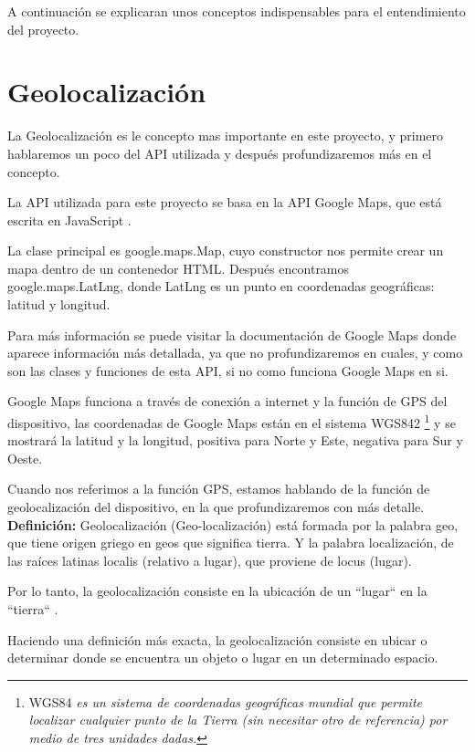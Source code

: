 
A continuación se explicaran unos conceptos indispensables para el entendimiento del proyecto.
\section{Geolocalización}\label{geolocalizacion}
La Geolocalización es le concepto mas importante en este proyecto, y primero hablaremos un poco del API utilizada y después profundizaremos más en el concepto.

La API utilizada para este proyecto se basa en la API Google Maps, que está escrita en JavaScript \cite{noauthor_google_nodate:a}.

La clase principal es google.maps.Map, cuyo constructor nos permite crear un mapa dentro de un contenedor HTML. Después encontramos google.maps.LatLng, donde LatLng es un punto en coordenadas geográficas: latitud y longitud.

Para más información se puede visitar la documentación de Google Maps donde aparece información más detallada, ya que no profundizaremos en cuales, y como son las clases y funciones de esta API, si no como funciona Google Maps en si.

Google Maps funciona a través de conexión a internet y la función de GPS del dispositivo, las coordenadas de Google Maps están en el sistema WGS842 \footnote{WGS84 \textit{es un sistema de coordenadas geográficas mundial que permite localizar cualquier punto de la Tierra (sin necesitar otro de referencia) por medio de tres unidades dadas.}} y se mostrará la latitud y la longitud, positiva para Norte y Este, negativa para Sur y Oeste.

Cuando nos referimos a la función GPS, estamos hablando de la función de geolocalización del dispositivo, en la que profundizaremos con más detalle.
\\

\textbf{Definición:} Geolocalización (Geo-localización) está formada por la palabra geo, que tiene origen griego en geos que significa tierra. Y la palabra localización, de las raíces latinas localis  (relativo a lugar), que proviene de locus (lugar).

Por lo tanto, la geolocalización consiste en la ubicación de un ``lugar`` en la ``tierra`` \cite{noauthor_diccionario_nodate:a}. 

Haciendo una definición más exacta, la geolocalización consiste en ubicar o determinar donde se encuentra un objeto o lugar en un determinado espacio.

